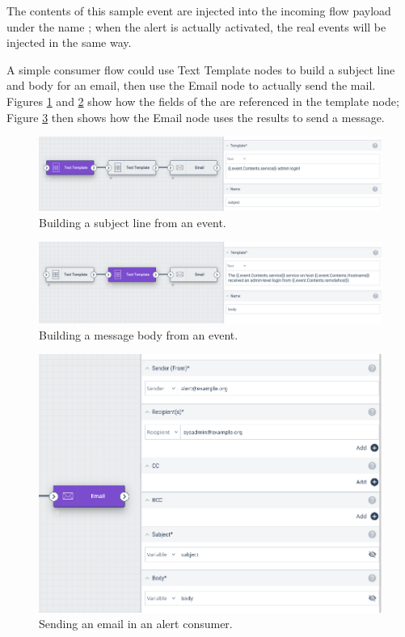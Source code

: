 The contents of this sample event are injected into the incoming flow payload under the name ; when the alert is actually activated, the real events will be injected in the same way.

A simple consumer flow could use Text Template nodes to build a subject line and body for an email, then use the Email node to actually send the mail. Figures \ref{fig:template-subject} and \ref{fig:template-body} show how the fields of the  are referenced in the template node; Figure \ref{fig:email-consumer} then shows how the Email node uses the results to send a message.

\begin{figure}
	\includegraphics[width=0.85\linewidth]{images/template-subject.png}
	\caption{Building a subject line from an event.}
	\label{fig:template-subject}
\end{figure}

\begin{figure}
	\includegraphics[width=0.85\linewidth]{images/template-body.png}
	\caption{Building a message body from an event.}
	\label{fig:template-body}
\end{figure}

\begin{figure}
	\includegraphics[width=0.75\linewidth]{images/email-consumer.png}
	\caption{Sending an email in an alert consumer.}
	\label{fig:email-consumer}
\end{figure}

